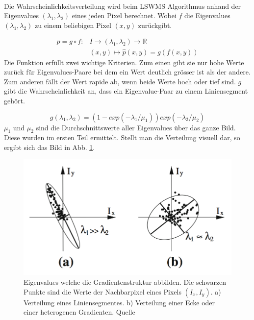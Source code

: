 \paragraph{}
Die Wahrscheinlichkeitsverteilung wird beim LSWMS Algorithmus anhand der Eigenvalues $(\lambda_1, \lambda_2)$ eines jeden Pixel berechnet. Wobei $f$ die Eigenvalues $(\lambda_1, \lambda_2)$ zu einem beliebigen Pixel $(x, y)$ zurückgibt.

\begin{equation}
\begin{split}
p = g \circ f:  &I \to (\lambda_1, \lambda_2) \to \mathbb{R} \\
                &(x, y) \mapsto \hat{p}(x, y) = g(f(x, y))
\end{split}
\end{equation}
\noindent
Die Funktion erfüllt zwei wichtige Kriterien. Zum einen gibt sie nur hohe Werte zurück für Eigenvalues-Paare bei dem ein Wert deutlich grösser ist als der andere. Zum anderen fällt der Wert rapide ab, wenn beide Werte hoch oder tief sind. $g$ gibt die Wahrscheinlichkeit an, dass ein Eigenvalue-Paar zu einem Liniensegment gehört.

\begin{equation}
g(\lambda_1, \lambda_2) = (1 - exp(-\lambda_1/\mu_1)) exp(-\lambda_2/\mu_2)
\end{equation}
\noindent
$\mu_1$ und $\mu_2$ sind die Durchschnittswerte aller Eigenvalues über das ganze Bild. Diese wurden im ersten Teil ermittelt. Stellt man die Verteilung visuell dar, so ergibt sich das Bild in Abb. \ref{fig:lswms-eigenvalues}.

\begin{figure}[!ht]
\centering
\includegraphics[width=\textwidth]{images/lswms-eigenvalues} 
\caption{Eigenvalues welche die Gradientenstruktur abbilden. Die schwarzen Punkte sind die Werte der Nachbarpixel eines Pixels $(I_x, I_y)$. a) Verteilung eines Liniensegmentes. b) Verteilung einer Ecke oder einer heterogenen Gradienten. Quelle \cite{nieto}}
\label{fig:lswms-eigenvalues}
\end{figure}
\noindent
